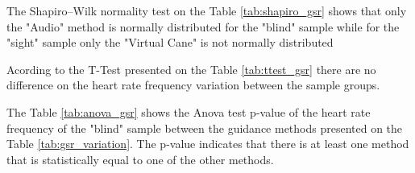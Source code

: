 

%
%    
%
%
%
%
%    
%
The Shapiro–Wilk normality test on the Table \ref{tab:shapiro_gsr} shows that only the "Audio" method is normally distributed for the "blind" sample while for the "sight" sample only the "Virtual Cane" is not normally distributed



Acording to the T-Test presented on the Table \ref{tab:ttest_gsr} there are no difference on the heart rate frequency variation between the sample groups.



The Table \ref{tab:anova_gsr} shows the Anova test p-value of the heart rate frequency of the "blind" sample between the guidance methods presented on the Table \ref{tab:gsr_variation}. The p-value indicates that there is at least one method that is statistically equal to one of the other methods.

